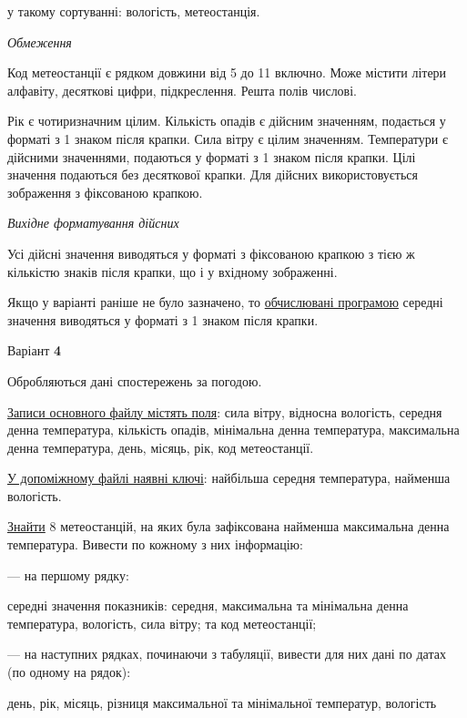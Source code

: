 \documentclass[11pt, ukrainian]{article}
\begin{document}
{\noindent}у такому сортуванні: вологість, метеостанція.


\bigskip\textit{Обмеження}

Код метеостанції є рядком довжини від 5 до 11 включно.
Може містити літери алфавіту, десяткові цифри, підкреслення. Решта полів числові.

Рік є чотиризначним цілим.
Кількість опадів є дійсним значенням, подається у форматі з 1 знаком після крапки.
Сила вітру є цілим значенням.
Температури є дійсними значеннями, подаються у форматі з 1 знаком після крапки.
Цілі значення подаються без десяткової крапки.
Для дійсних використовується зображення з фіксованою крапкою.

\textit{Вихідне форматування дійсних}

Усі дійсні значення виводяться у форматі з фіксованою крапкою з тією ж кількістю знаків після крапки, що і у вхідному зображенні.

Якщо у варіанті раніше не було зазначено, то \underline{обчислювані програмою} середні значення виводяться у форматі з 1 знаком після крапки.


\par
\newpage
{\center Варіант  \No \textbf { 4 }\par}
\bigskip
Обробляються дані спостережень за погодою. 

\underline{Записи основного файлу містять поля}: сила вітру, відносна вологість, середня денна температура, кількість опадів, мінімальна денна температура, максимальна денна температура, день, місяць, рік, код метеостанції.

\underline{У допоміжному файлі наявні ключі}: найбільша середня температура, найменша вологість.

\underline{Знайти} 8 метеостанцій, на яких була зафіксована найменша максимальна денна температура. Вивести по кожному з них інформацію:\par
{\noindent}--- на першому рядку:\par
середні значення показників: середня, максимальна та мінімальна денна  температура, вологість, сила вітру; та код метеостанції;

{\noindent}--- на наступних рядках, починаючи з табуляції, вивести для них дані по датах (по одному на рядок):\par
день, рік, місяць, різниця максимальної та мінімальної температур, вологість
\end{document}
